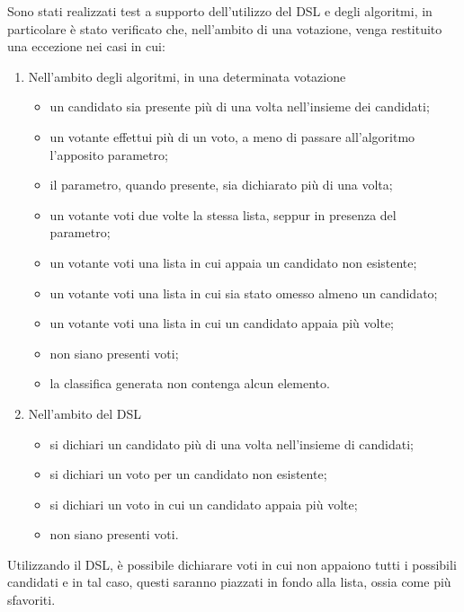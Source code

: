 \documentclass[12pt,a4paper,openright,twoside]{book}
\begin{document}


Sono stati realizzati test a supporto dell'utilizzo del DSL e degli algoritmi, in particolare è stato verificato che, nell'ambito di una votazione, venga 
restituito una eccezione nei casi in cui: 
\begin{enumerate}
    \item{Nell'ambito degli algoritmi, in una determinata votazione
        \begin{itemize}
        \item{un candidato sia presente più di una volta nell'insieme dei candidati;}
        \item{un votante effettui più di un voto, a meno di passare all'algoritmo l'apposito parametro;}
        \item{il parametro, quando presente, sia dichiarato più di una volta;}
        \item{un votante voti due volte la stessa lista, seppur in presenza del parametro;}
        \item{un votante voti una lista in cui appaia un candidato non esistente;}
        \item{un votante voti una lista in cui sia stato omesso almeno un candidato;}
        \item{un votante voti una lista in cui un candidato appaia più volte;}
        \item{non siano presenti voti;}
        \item{la classifica generata non contenga alcun elemento.}
       \end{itemize}}
    \item{Nell'ambito del DSL
        \begin{itemize}
            \item{si dichiari un candidato più di una volta nell'insieme di candidati;}
            \item{si dichiari un voto per un candidato non esistente;}
            \item{si dichiari un voto in cui un candidato appaia più volte;}
            \item{non siano presenti voti.}
        \end{itemize}
    }

\end{enumerate}

Utilizzando il DSL, è possibile dichiarare voti in cui non appaiono tutti i possibili candidati e in tal caso,
questi saranno piazzati in fondo alla lista, ossia come più sfavoriti.
\end{document}
